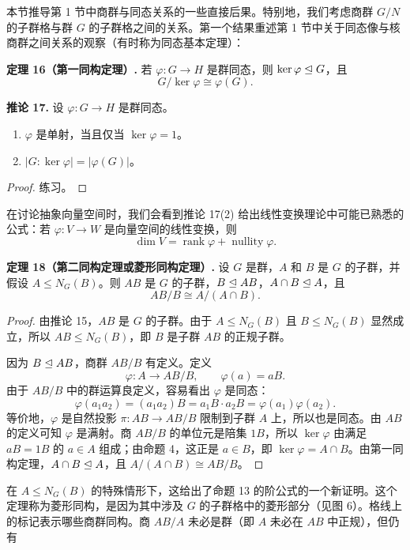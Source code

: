 本节推导第 1 节中商群与同态关系的一些直接后果。特别地，我们考虑商群 $G/N$ 的子群格与群 $G$ 的子群格之间的关系。第一个结果重述第 1 节中关于同态像与核商群之间关系的观察（有时称为同态基本定理）：

\medskip
\noindent\textbf{定理 16（第一同构定理）.} 若 $\varphi:G\to H$ 是群同态，则 $\ker\varphi\trianglelefteq G$，且
\[
  G/\ker\varphi\cong \varphi(G).
\]

\medskip
\noindent\textbf{推论 17.} 设 $\varphi:G\to H$ 是群同态。
\begin{enumerate}[label=(\arabic*)]
  \item $\varphi$ 是单射，当且仅当 $\ker\varphi=1$。
  \item $|G:\ker\varphi|=|\varphi(G)|$。
\end{enumerate}

\begin{proof}
练习。
\end{proof}

在讨论抽象向量空间时，我们会看到推论 17(2) 给出线性变换理论中可能已熟悉的公式：若 $\varphi:V\to W$ 是向量空间的线性变换，则
\[
  \dim V=\operatorname{rank}\varphi+\operatorname{nullity}\varphi.
\]

\medskip
\noindent\textbf{定理 18（第二同构定理或菱形同构定理）.} 设 $G$ 是群，$A$ 和 $B$ 是 $G$ 的子群，并假设 $A\leq N_G(B)$。则 $AB$ 是 $G$ 的子群，$B\trianglelefteq AB$，$A\cap B\trianglelefteq A$，且
\[
  AB/B\cong A/(A\cap B).
\]

\begin{proof}
由推论 15，$AB$ 是 $G$ 的子群。由于 $A\leq N_G(B)$ 且 $B\leq N_G(B)$ 显然成立，所以 $AB\leq N_G(B)$，即 $B$ 是子群 $AB$ 的正规子群。

因为 $B\trianglelefteq AB$，商群 $AB/B$ 有定义。定义
\[
  \varphi:A\to AB/B,
  \qquad \varphi(a)=aB.
\]
由于 $AB/B$ 中的群运算良定义，容易看出 $\varphi$ 是同态：
\[
  \varphi(a_1a_2)=(a_1a_2)B=a_1B\cdot a_2B=\varphi(a_1)\varphi(a_2).
\]
等价地，$\varphi$ 是自然投影 $\pi:AB\to AB/B$ 限制到子群 $A$ 上，所以也是同态。由 $AB$ 的定义可知 $\varphi$ 是满射。商 $AB/B$ 的单位元是陪集 $1B$，所以 $\ker\varphi$ 由满足 $aB=1B$ 的 $a\in A$ 组成；由命题 4，这正是 $a\in B$，即 $\ker\varphi=A\cap B$。由第一同构定理，$A\cap B\trianglelefteq A$，且 $A/(A\cap B)\cong AB/B$。
\end{proof}

在 $A\leq N_G(B)$ 的特殊情形下，这给出了命题 13 的阶公式的一个新证明。这个定理称为菱形同构，是因为其中涉及 $G$ 的子群格中的菱形部分（见图 6）。格线上的标记表示哪些商群同构。商 $AB/A$ 未必是群（即 $A$ 未必在 $AB$ 中正规），但仍有

